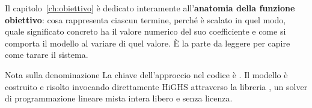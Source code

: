 Il capitolo~\ref{ch:obiettivo} è dedicato interamente all'\textbf{anatomia della funzione
obiettivo}: cosa rappresenta ciascun termine, perché è scalato in quel modo, quale significato
concreto ha il valore numerico del suo coefficiente e come si comporta il modello al variare di
quel valore. È la parte da leggere per capire come tarare il sistema.

\begin{notebox}{Nota sulla denominazione}
La chiave dell'approccio nel codice è . Il modello è costruito e risolto
invocando direttamente HiGHS attraverso la libreria , un solver di programmazione
lineare mista intera libero e senza licenza.
\end{notebox}
